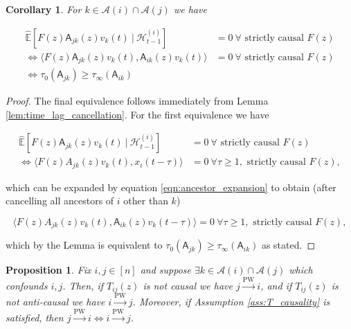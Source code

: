 \documentclass{statsoc}
\def\pwgc{\overset{\text{PW}}{\rightarrow}}  %
\def\A{\mathsf{A}}  %
\def\H{\mathcal{H}}  %
\newcommand{\linE}[2]{\hat{\E}[#1\ |\ #2]}  %
\newcommand{\anc}[1]{\mathcal{A}(#1)}  %
\newtheorem{corollary}{Corollary}
\newtheorem{proposition}{Proposition}
\def\H{\mathcal{H}}  %
\def\E{\mathbb{E}}  %
\newcommand{\inner}[2]{\langle #1, #2 \rangle}  %
\begin{document}
\begin{corollary}
  \label{cor:time_lag_cancellation}
  For $k \in \anc{i} \cap \anc{j}$ we have

  \begin{align*}
    \linE{F(z)\A_{jk}(z)v_k(t)}{\H_{t - 1}^{(i)}} &= 0\ \forall \text{ strictly causal } F(z)\\
    \iff \inner{F(z)\A_{jk}(z)v_k(t)}{\A_{ik}(z)v_k(t)} &= 0\ \forall \text{ strictly causal } F(z)\\
    \iff \tau_0(\A_{jk}) \ge \tau_\infty(\A_{ik})
  \end{align*}
\end{corollary}
\begin{proof}
  The final equivalence follows immediately from Lemma \ref{lem:time_lag_cancellation}.  For the first equivalence we have

  \begin{align*}
    \linE{F(z)\A_{jk}(z)v_k(t)}{\H_{t - 1}^{(i)}} &= 0\ \forall \text{ strictly causal } F(z)\\
    \iff \inner{F(z)A_{jk}(z)v_k(t)}{x_i(t - \tau)} &= 0\ \forall \tau \ge 1, \text{ strictly causal } F(z),
  \end{align*}

  which can be expanded by equation \eqref{eqn:ancestor_expansion} to
  obtain (after cancelling all ancestors of $i$ other than $k$)

  \begin{equation*}
    \inner{F(z)A_{jk}(z)v_k(t)}{\A_{ik}(z)v_k(t - \tau)} = 0\ \forall \tau \ge 1, \text{ strictly causal } F(z),
  \end{equation*}

  which by the Lemma is equivalent to $\tau_0(\A_{jk}) \ge \tau_\infty(\A_{ik})$ as stated.
\end{proof}

\begin{proposition}
  \label{prop:persistence_converse}
  Fix $i, j \in [n]$ and suppose $\exists k \in \anc{i} \cap \anc{j}$
  which confounds $i, j$.  Then, if $T_{ij}(z)$ is not causal we have
  $j \pwgc i$, and if $T_{ij}(z)$ is not anti-causal we have
  $i \pwgc j$.  Moreover, if Assumption \ref{ass:T_causality} is
  satisfied, then $j \pwgc i \iff i \pwgc j$.
\end{proposition}
\end{document}
